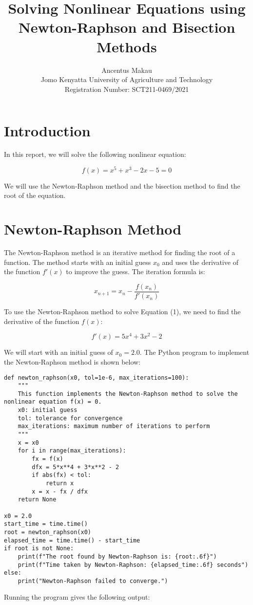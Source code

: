 \documentclass{article}
\title{Solving Nonlinear Equations using Newton-Raphson and Bisection Methods}
\author{Ancentus Makau \\ Jomo Kenyatta University of Agriculture and Technology \\ Registration Number: SCT211-0469/2021}
\date{}
\begin{document}
\maketitle

\section{Introduction}

In this report, we will solve the following nonlinear equation:

\begin{equation}
    f(x) = x^5 + x^3 - 2x - 5 = 0
\end{equation}

We will use the Newton-Raphson method and the bisection method to find the root of the equation.

\section{Newton-Raphson Method}

The Newton-Raphson method is an iterative method for finding the root of a function. The method starts with an initial guess $x_0$ and uses the derivative of the function $f'(x)$ to improve the guess. The iteration formula is:

\begin{equation}
    x_{n+1} = x_n - \frac{f(x_n)}{f'(x_n)}
\end{equation}

To use the Newton-Raphson method to solve Equation (1), we need to find the derivative of the function $f(x)$:

\begin{equation}
    f'(x) = 5x^4 + 3x^2 - 2
\end{equation}

We will start with an initial guess of $x_0 = 2.0$.
The Python program to implement the Newton-Raphson method is shown below:

\begin{lstlisting}
def newton_raphson(x0, tol=1e-6, max_iterations=100):
    """
    This function implements the Newton-Raphson method to solve the nonlinear equation f(x) = 0.
    x0: initial guess
    tol: tolerance for convergence
    max_iterations: maximum number of iterations to perform
    """
    x = x0
    for i in range(max_iterations):
        fx = f(x)
        dfx = 5*x**4 + 3*x**2 - 2
        if abs(fx) < tol:
            return x
        x = x - fx / dfx
    return None

x0 = 2.0
start_time = time.time()
root = newton_raphson(x0)
elapsed_time = time.time() - start_time
if root is not None:
    print(f"The root found by Newton-Raphson is: {root:.6f}")
    print(f"Time taken by Newton-Raphson: {elapsed_time:.6f} seconds")
else:
    print("Newton-Raphson failed to converge.")

\end{lstlisting}
Running the program gives the following output:
\end{document}

